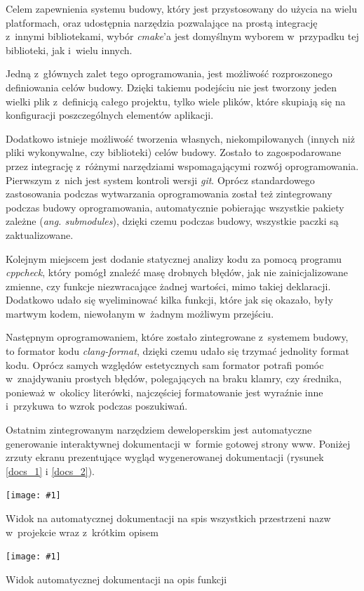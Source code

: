 \documentclass[12pt]{article}
\newcommand{\n}{\newline}
\newcommand{\putss}[3]{
\begin{captioned}[H]
	\centering
	\texttt{[image: \#1]}
	\caption{#2}
	\label{#3}
	\medskip
\end{captioned}
}
\newcommand{\nonpl}[1]{{\it #1}}
\newcommand{\ang}[1]{\nonpl{ang. #1}}
\begin{document}
{{{				Celem zapewnienia systemu budowy, który jest przystosowany do użycia na wielu platformach, oraz udostępnia narzędzia pozwalające na prostą
				integrację z~innymi bibliotekami, wybór \nonpl{cmake}'a\cite{cmake_docs} jest domyślnym wyborem w~przypadku tej biblioteki, jak i~wielu innych.\n

				Jedną z~głównych zalet tego oprogramowania, jest możliwość rozproszonego definiowania celów budowy. Dzięki takiemu podejściu nie jest tworzony
				jeden wielki plik z~definicją całego projektu, tylko wiele plików, które skupiają się na konfiguracji poszczególnych elementów aplikacji.\n

				Dodatkowo istnieje możliwość tworzenia własnych, niekompilowanych (innych niż pliki wykonywalne, czy biblioteki) celów budowy. Zostało to zagospodarowane
				przez integrację z~różnymi narzędziami wspomagającymi rozwój oprogramowania. Pierwszym z~nich jest system kontroli wersji \nonpl{git}\cite{git_docs}. Oprócz standardowego
				zastosowania podczas wytwarzania oprogramowania został też zintegrowany podczas budowy oprogramowania, automatycznie pobierając wszystkie pakiety zależne
				(\ang{submodules}), dzięki czemu podczas budowy, wszystkie paczki są zaktualizowane.\n

				Kolejnym miejscem jest dodanie statycznej analizy kodu za pomocą programu \nonpl{cppcheck}\cite{cppcheck_repo}, który pomógł znaleźć masę drobnych błędów,
				jak nie zainicjalizowane zmienne, czy funkcje niezwracające żadnej wartości, mimo takiej deklaracji. Dodatkowo udało się wyeliminować kilka funkcji,
				które jak się okazało, były martwym kodem, niewołanym w~żadnym możliwym przejściu.\n

				Następnym oprogramowaniem, które zostało zintegrowane z~systemem budowy, to formator kodu \nonpl{clang-format}\cite{clangformat_docs}, dzięki czemu
				udało się trzymać jednolity format kodu. Oprócz samych względów estetycznych sam formator potrafi pomóc w~znajdywaniu prostych błędów, polegających
				na braku klamry, czy średnika, ponieważ w~okolicy literówki, najczęściej formatowanie jest wyraźnie inne i~przykuwa to wzrok podczas poszukiwań.\n

				Ostatnim zintegrowanym narzędziem deweloperskim jest automatyczne generowanie interaktywnej dokumentacji w~formie gotowej strony www. Poniżej zrzuty
				ekranu prezentujące wygląd wygenerowanej dokumentacji (rysunek \ref{docs_1} i \ref{docs_2}).\n

				\putss{./img/documentation_part_1.png}{Widok na automatycznej dokumentacji na spis wszystkich przestrzeni nazw w~projekcie wraz z~krótkim opisem}{docs_1}
				\putss{./img/documentation_part_2.png}{Widok automatycznej dokumentacji na opis funkcji}{docs_2}

}}}
\end{document}
